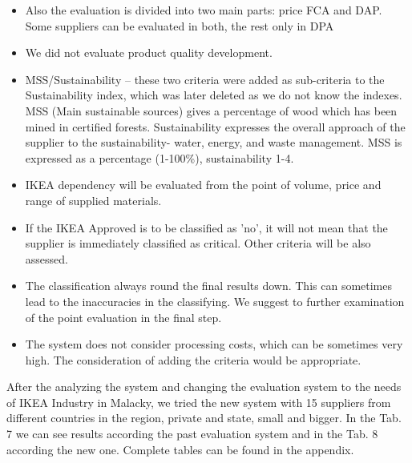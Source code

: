 \documentclass[oneside,12pt]{article}%
\begin{document}
\begin{itemize}
    \item Also the evaluation is divided into two main parts: price FCA and DAP. Some suppliers can be evaluated in both, the rest only in DPA
    \item We did not evaluate product quality development.
    \item MSS/Sustainability – these two criteria were added as sub-criteria to the Sustainability index, which was later deleted as we do not know the indexes. MSS (Main sustainable sources) gives a percentage of wood which has been mined in certified forests. Sustainability expresses the overall approach of the supplier to the sustainability- water, energy, and waste management. MSS is expressed as a percentage (1-100\%), sustainability 1-4.
  \item IKEA dependency will be evaluated from the point of volume, price and range of supplied materials.
  \item If the IKEA Approved is to be classified as 'no', it will not mean that the supplier is immediately classified as critical. Other criteria will be also assessed.
  \item The classification always round the final results down. This can sometimes lead to the inaccuracies in the classifying. We suggest to further examination of the point evaluation in the final step.
  \item The system does not consider processing costs, which can be sometimes very high. The consideration of adding the criteria would be appropriate.

\end{itemize}


After the analyzing the system and changing the evaluation system to the needs of IKEA Industry in Malacky, we tried the new system with 15 suppliers from different countries in the region, private and state, small and bigger. In the Tab. 7 we can see results according the past evaluation system and in the Tab. 8 according the new one. Complete tables can be found in the appendix. \par
\end{document}
